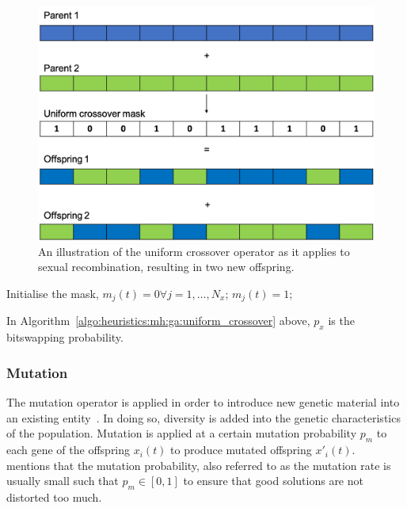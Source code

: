 \begin{figure}[htbp]
      \includegraphics[width=\textwidth]{images/uniform_crossover.png}
      \caption{An illustration of the uniform crossover operator as it applies to sexual recombination, resulting in two new offspring.}
      \label{fig:heuristics:mh:ga:uniform_crossover}
\end{figure}


\begin{algorithm}[H]
      \caption{The pseudo code for the uniform crossover operator as used by \acp{GA}.}
      \label{algo:heuristics:mh:ga:uniform_crossover}
      \begin{algorithmic}
            \State Initialise the mask, $m_{j}(t) = 0 \forall j = 1, \dots, N_{x}$;
            \State $m_{j}(t) = 1$;
            \EndIf
            \EndFor
            \State
      \end{algorithmic}
\end{algorithm}

In Algorithm~\ref{algo:heuristics:mh:ga:uniform_crossover} above, $p_{x}$ is the bitswapping probability.


\subsubsection{Mutation}
\label{sec:heuristics:mh:ga:mutation}

The mutation operator is applied in order to introduce new genetic material into an existing entity~\cite{ref:engelbrecht:2007}. In doing so, diversity is added into the genetic characteristics of the population. Mutation is applied at a certain mutation probability $p_{m}$ to each gene of the offspring $x_{i}(t)$ to produce mutated offspring $x'_{i}(t)$.~\citeauthor{ref:engelbrecht:2007}\cite{ref:engelbrecht:2007} mentions that the mutation probability, also referred to as the mutation rate is usually small such that $p_{m} \in [0,1]$ to ensure that good solutions are not distorted too much.

